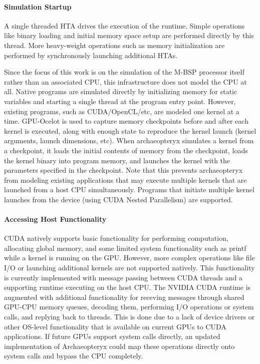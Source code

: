 \documentclass[conference, 10pt]{IEEEtran}
\begin{document}
\paragraph{Simulation Startup}
A single threaded HTA drives the execution of the runtime.
Simple operations like binary loading and initial memory space setup are
performed directly by this thread.  More heavy-weight operations such as memory
initialization are performed by synchronously launching additional HTAs.

Since the focus of this work is on the simulation of the M-BSP processor itself
rather than an associated CPU, this infrastructure does not model the CPU at
all.  Native programs are simulated directly by initializing memory for static
variables and starting a single thread at the program entry point.  However,
existing programs, such as CUDA/OpenCL/etc, are modeled one kernel at a time.  
GPU-Ocelot is used to capture memory checkpoints before and after each kernel
is executed, along with enough state to reproduce the kernel launch (kernel
arguments, launch dimensions, etc).  When archaeopteryx simulates a kernel
from a checkpoint, it loads the initial contents of memory from the checkpoint,
loads the kernel binary into program memory, and launches the kernel with
the parameters specified in the checkpoint.  Note that this prevents
archaeopteryx from modeling existing applications that may execute multiple
kernels that are launched from a host CPU simultaneously.  Programs that
initiate multiple kernel launches from the device (using CUDA Nested
Parallelism) are supported.



\paragraph{Accessing Host Functionality}
CUDA natively supports basic functionality for performing computation,
allocating global memory, and some limited system functionality such as printf
while a kernel is running on the GPU.  However, more complex operations like
file I/O or launching additional kernels are not supported natively. 
This functionality is currently implemented with message passing between
CUDA threads and a supporting runtime executing on the host CPU.  The NVIDIA
CUDA runtime is augmented with additional functionality for receving messages
through shared GPU-CPU memory queues, decoding them, performing I/O operations
or system calls, and replying back to threads.  This is done due to a lack of
device drivers or other OS-level functionality that is available on current GPUs
to CUDA applications. If future GPUs support system calls directly, an updated
implementation of Archaeopteryx could map these operations directly onto system
calls and bypass the CPU completely.
\end{document}

